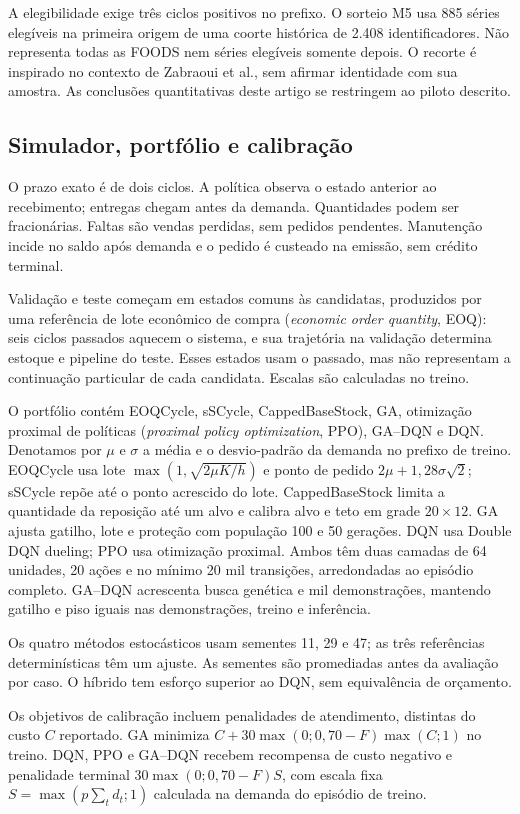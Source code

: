 \documentclass[preprint,12pt]{elsarticle}
\begin{document}
A elegibilidade exige três ciclos positivos no prefixo. O sorteio M5 usa 885 séries elegíveis na primeira origem de uma coorte histórica de 2.408 identificadores. Não representa todas as FOODS nem séries elegíveis somente depois. O recorte é inspirado no contexto de Zabraoui et al., sem afirmar identidade com sua amostra. As conclusões quantitativas deste artigo se restringem ao piloto descrito.

\subsection{Simulador, portfólio e calibração}
O prazo exato é de dois ciclos. A política observa o estado anterior ao recebimento; entregas chegam antes da demanda. Quantidades podem ser fracionárias. Faltas são vendas perdidas, sem pedidos pendentes. Manutenção incide no saldo após demanda e o pedido é custeado na emissão, sem crédito terminal.

Validação e teste começam em estados comuns às candidatas, produzidos por uma referência de lote econômico de compra (\textit{economic order quantity}, EOQ): seis ciclos passados aquecem o sistema, e sua trajetória na validação determina estoque e pipeline do teste. Esses estados usam o passado, mas não representam a continuação particular de cada candidata. Escalas são calculadas no treino.

O portfólio contém EOQCycle, sSCycle, CappedBaseStock, GA, otimização proximal de políticas (\textit{proximal policy optimization}, PPO), GA--DQN e DQN. Denotamos por $\mu$ e $\sigma$ a média e o desvio-padrão da demanda no prefixo de treino. EOQCycle usa lote $\max(1,\sqrt{2\mu K/h})$ e ponto de pedido $2\mu+1{,}28\sigma\sqrt2$; sSCycle repõe até o ponto acrescido do lote. CappedBaseStock limita a quantidade da reposição até um alvo e calibra alvo e teto em grade $20\times12$. GA ajusta gatilho, lote e proteção com população 100 e 50 gerações. DQN usa Double DQN dueling; PPO usa otimização proximal. Ambos têm duas camadas de 64 unidades, 20 ações e no mínimo 20 mil transições, arredondadas ao episódio completo. GA--DQN acrescenta busca genética e mil demonstrações, mantendo gatilho e piso iguais nas demonstrações, treino e inferência.

Os quatro métodos estocásticos usam sementes 11, 29 e 47; as três referências determinísticas têm um ajuste. As sementes são promediadas antes da avaliação por caso. O híbrido tem esforço superior ao DQN, sem equivalência de orçamento.

Os objetivos de calibração incluem penalidades de atendimento, distintas do custo $C$ reportado. GA minimiza $C+30\max(0;0{,}70-F)\max(C;1)$ no treino. DQN, PPO e GA--DQN recebem recompensa de custo negativo e penalidade terminal $30\max(0;0{,}70-F)S$, com escala fixa $S=\max(p\sum_t d_t;1)$ calculada na demanda do episódio de treino.
\end{document}
